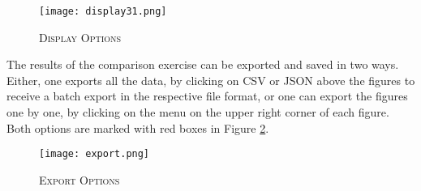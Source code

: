 \begin{figure}[H]
	\centering
	\caption{\textsc{Display Options}}
	\vspace{0.2cm}
	\texttt{[image: display31.png]}\\
	\label{display}
\end{figure}


The results of the comparison exercise can be exported and saved in two ways. Either, one exports all the data, by clicking on CSV or JSON above the figures to receive a batch export in the respective file format, or one can export the figures one by one, by clicking on the menu on the upper right corner of each figure. Both options are marked with red boxes in Figure \ref{export}.
\begin{figure}[H]
	\centering
	\caption{\textsc{Export Options}}
	\vspace{0.2cm}
	\texttt{[image: export.png]}\\
	\label{export}
\end{figure}
